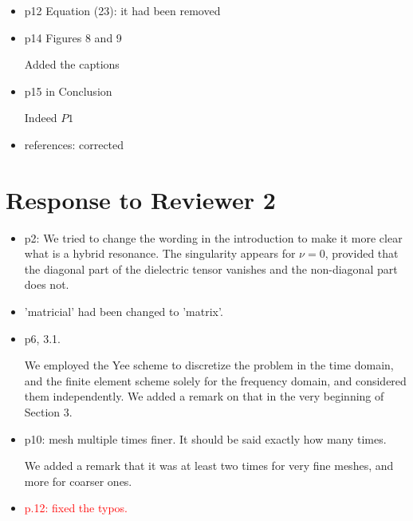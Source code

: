 \documentclass[a4paper,10pt]{article}
\begin{document}
\begin{itemize}
  
\item p12 Equation (23): it had been removed
  
\item p14 Figures 8 and 9

Added the captions  


\item p15 in Conclusion

  Indeed $P1$
  
\item references: corrected
  \end{itemize}


\section{Response to  Reviewer 2}
 \begin{itemize}
\item p2:  We tried to change the wording in the introduction to make it more clear what is a hybrid resonance. 
The singularity appears for $\nu=0$, provided that the diagonal part of the dielectric tensor vanishes and the non-diagonal part does not. 

\item 'matricial' had been changed to 'matrix'.

\item p6, 3.1. 

We employed the Yee scheme to discretize the problem in the time domain, and the finite element scheme solely for the frequency domain, 
and considered them independently. We added a remark on that in the very beginning of Section 3. 

\item p10: mesh multiple times finer. It should be said exactly how many times. 

We added a remark that it was at least two times for very fine meshes, and more for coarser ones.

\item {\textcolor{red}{p.12: fixed the typos.}}
\end{itemize}

  
 
\end{document}
